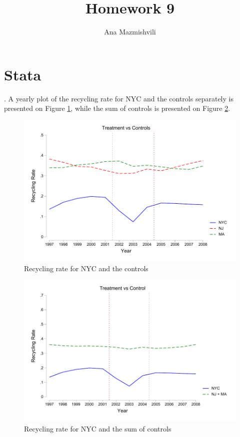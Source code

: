 \documentclass{article}
\title{Homework 9}
\author{Ana Mazmishvili}
\begin{document}
  
\maketitle

\section{Stata}
.  A yearly plot of the recycling rate for NYC and the controls separately is presented on Figure \ref{fig:NYCNJMA}, while the sum of controls is presented on Figure \ref{fig:NYCvsControls}. 

\begin{figure}[h!]
    \centering
    \includegraphics{homework 9/data/treatedvscontrol.pdf}
    \caption{Recycling rate for NYC and the controls}
    \label{fig:NYCNJMA}
\end{figure}

\begin{figure}[h!]
    \centering
    \includegraphics{homework 9/data/linechartrecyclingrate.pdf}
    \caption{Recycling rate for NYC and the sum of controls}
    \label{fig:NYCvsControls}
\end{figure}
\end{document}
